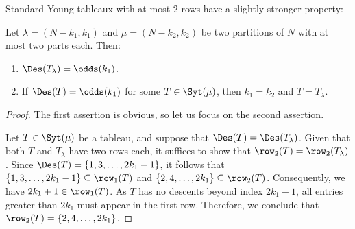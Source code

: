 Standard Young tableaux with at most $2$ rows have a slightly stronger property:
\begin{lemma}
\label{lem:superstandard two rows characterize coefficients}
    Let $\lambda = (N-k_1,k_1)$ and $\mu = (N-k_2,k_2)$ be two partitions of $N$ with at most two parts each. Then:
    \begin{enumerate}
        \item $\Des(T_\lambda) = \odds(k_1)$.
        \item If $\Des(T) = \odds(k_1)$ for some $T \in \Syt(\mu)$, then $k_1 = k_2$ and $T = T_\lambda$.
    \end{enumerate}
\end{lemma}

    

\begin{proof}
    The first assertion is obvious, so let us focus on the second assertion.

    Let $T \in \Syt(\mu)$ be a tableau, and suppose that $\Des(T) = \Des(T_\lambda)$. Given that both $T$ and $T_\lambda$ have two rows each, it suffices to show that $\row_2(T) = \row_2(T_\lambda)$. Since $\Des(T) = \{1,3,\dots,2k_1-1\}$, it follows that $\{1,3,\dots,2k_1-1\} \subseteq \row_1(T)$ and $\{2,4,\dots,2k_1\} \subseteq \row_2(T)$. Consequently, we have $2k_1+1 \in \row_1(T)$. As $T$ has no descents beyond index $2k_1-1$, all entries greater than $2k_1$ must appear in the first row. Therefore, we conclude that $\row_2(T) = \{2,4,\dots,2k_1\}$.
\end{proof}

